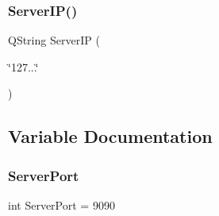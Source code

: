 \mbox{\label{main_8cpp_a4427e551486ec704056e120918e55346}} 
\subsubsection{Server\+I\+P()}
{\footnotesize\ttfamily Q\+String Server\+IP (\begin{DoxyParamCaption}\item[{\char`\"{}127.\+0.\+0.\+1\char`\"{}}]{ }\end{DoxyParamCaption})}



\subsection{Variable Documentation}
\mbox{\label{main_8cpp_ac07f72fb0144988faf99f36493c1958a}} 
\subsubsection{Server\+Port}
{\footnotesize\ttfamily int Server\+Port = 9090}

